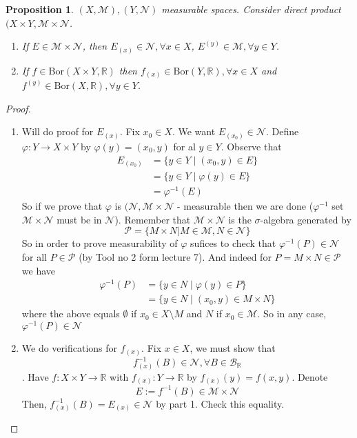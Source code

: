 \documentclass[letterpaper, 12pt]{article}
\newcommand{\cB}{\mathcal{B}}
\newcommand{\cM}{\mathcal{M}}
\newcommand{\cN}{\mathcal{N}}
\newcommand{\bR}{\mathbb{R}}
\newcommand{\cP}{\mathcal{P}}
\newcommand{\Bor}{\mathrm{Bor}}
\theoremstyle{stdthm}
\newtheorem{prop}[thm]{Proposition}
\theoremstyle{stddef}
\theoremstyle{stdnonum}
\theoremstyle{stdqands}
\theoremstyle{stdbold}
\begin{document}
\begin{prop}
$(X,\cM), (Y,\cN)$ measurable spaces. Consider direct product $(X\times Y, \cM \times \cN$. 
\begin{enumerate}
\item If $E \in \cM \times \cN$, then $E_{(x)} \in \cN, \forall x \in X$, $E^{(y)} \in \cM, \forall y \in Y$. 
\item If $f \in \Bor(X\times Y, \bR)$ then $f_{(x)} \in \Bor(Y,\bR), \forall x \in X$ and $f^{(y)} \in \Bor (X,\bR), \forall y \in Y$. 
\end{enumerate}
\end{prop}

\begin{proof}
\begin{enumerate}
\item Will do proof for $E_{(x)}$. Fix $x_0 \in X$. We want $E_{(x_0)} \in \cN$. Define $\varphi: Y \to X\times Y$ by $\varphi(y) = (x_0,y)$ for al $y \in Y$. Observe that 
\begin{align*}
E_{(x_0)} &= \{y \in Y \mid (x_0,y) \in E\}\\
&= \{ y \in Y \mid \varphi(y) \in E \}\\
&= \varphi^{-1}(E)
\end{align*}
So if we prove that $\varphi$ is $(\cN, \cM \times \cN$ - measurable then we are done ($\varphi^{-1}$ set $\cM \times \cN$ must be in $\cN$). Remember that $\cM \times \cN$ is the $\sigma$-algebra generated by 
\[ \cP = \{ M \times N| M \in \cM, N \in \cN \}\] So in order to prove measurability of $\varphi$ sufices to check that  $\varphi^{-1}(P) \in \cN$ for all $P \in \cP$ (by Tool no 2 form lecture 7). And indeed for $P = M \times N \in \cP$ we have 
\begin{align*}
\varphi^{-1}(P)& = \{y \in N \mid \varphi(y) \in P \}\\
&= \{y \in N \mid (x_0, y) \in M \times N\}
\end{align*}
where the above equals $\emptyset$ if $x_0 \in X \setminus M$ and $N$ if $x_0 \in \cM$. So in any case, $\varphi^{-1}(P) \in \cN$

\item We do verifications for $f_{(x)}$. Fix $x \in X$, we must show that 
\[ f_{(x)}^{-1}(B) \in \cN, \forall B \in \cB_{\bR}\]. Have $f:X\times Y \to \bR$ with $f_{(x)}: Y \to \bR$ by $f_{(x)}(y) = f(x,y)$. Denote 
\[ E := f^{-1} (B) \in \cM \times \cN \]
Then, $f_{(x)}^{-1} (B) = E_{(x)} \in \cN$ by part 1. Check this equality.
\end{enumerate}

\end{proof}
\end{document}
